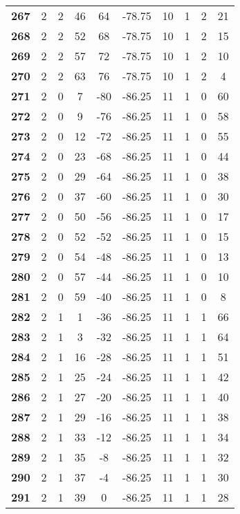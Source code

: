 \documentclass[12pt,letterpaper, onecolumn]{exam}
\begin{document}
\begin{longtable}{cccccccccc}
    \textbf{267} & 2 & 2 & 46 & 64 & -78.75 & 10 & 1 & 2 & 21 \\ 
    \textbf{268} & 2 & 2 & 52 & 68 & -78.75 & 10 & 1 & 2 & 15 \\ 
    \textbf{269} & 2 & 2 & 57 & 72 & -78.75 & 10 & 1 & 2 & 10 \\ 
    \textbf{270} & 2 & 2 & 63 & 76 & -78.75 & 10 & 1 & 2 & 4 \\ 
    \textbf{271} & 2 & 0 & 7 & -80 & -86.25 & 11 & 1 & 0 & 60 \\ 
    \textbf{272} & 2 & 0 & 9 & -76 & -86.25 & 11 & 1 & 0 & 58 \\ 
    \textbf{273} & 2 & 0 & 12 & -72 & -86.25 & 11 & 1 & 0 & 55 \\ 
    \textbf{274} & 2 & 0 & 23 & -68 & -86.25 & 11 & 1 & 0 & 44 \\ 
    \textbf{275} & 2 & 0 & 29 & -64 & -86.25 & 11 & 1 & 0 & 38 \\ 
    \textbf{276} & 2 & 0 & 37 & -60 & -86.25 & 11 & 1 & 0 & 30 \\ 
    \textbf{277} & 2 & 0 & 50 & -56 & -86.25 & 11 & 1 & 0 & 17 \\ 
    \textbf{278} & 2 & 0 & 52 & -52 & -86.25 & 11 & 1 & 0 & 15 \\  \hline
    \textbf{279} & 2 & 0 & 54 & -48 & -86.25 & 11 & 1 & 0 & 13 \\    
    \textbf{280} & 2 & 0 & 57 & -44 & -86.25 & 11 & 1 & 0 & 10 \\ 
    \textbf{281} & 2 & 0 & 59 & -40 & -86.25 & 11 & 1 & 0 & 8 \\ 
    \textbf{282} & 2 & 1 & 1 & -36 & -86.25 & 11 & 1 & 1 & 66 \\ 
    \textbf{283} & 2 & 1 & 3 & -32 & -86.25 & 11 & 1 & 1 & 64 \\ 
    \textbf{284} & 2 & 1 & 16 & -28 & -86.25 & 11 & 1 & 1 & 51 \\ 
    \textbf{285} & 2 & 1 & 25 & -24 & -86.25 & 11 & 1 & 1 & 42 \\ 
    \textbf{286} & 2 & 1 & 27 & -20 & -86.25 & 11 & 1 & 1 & 40 \\ 
    \textbf{287} & 2 & 1 & 29 & -16 & -86.25 & 11 & 1 & 1 & 38 \\ 
    \textbf{288} & 2 & 1 & 33 & -12 & -86.25 & 11 & 1 & 1 & 34 \\ 
    \textbf{289} & 2 & 1 & 35 & -8 & -86.25 & 11 & 1 & 1 & 32 \\ 
    \textbf{290} & 2 & 1 & 37 & -4 & -86.25 & 11 & 1 & 1 & 30 \\ 
    \textbf{291} & 2 & 1 & 39 & 0 & -86.25 & 11 & 1 & 1 & 28 \\ 

\end{longtable}
\end{document}
